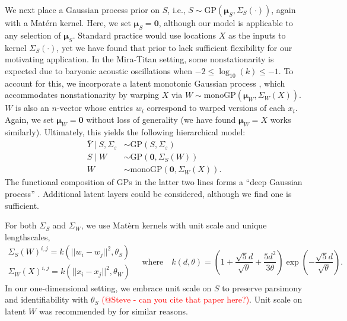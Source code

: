 \documentclass[11pt]{article}
\begin{document}
We next place a Gaussian process prior on $S$, i.e.,
$S\sim \mathrm{GP}\left(\boldsymbol{\mu}_S, \Sigma_S(\cdot)\right)$, again with a 
Mat\'ern kernel. Here, we set $\boldsymbol{\mu}_S=\mathbf{0}$, although our model
is applicable to any selection of $\boldsymbol{\mu}_S$. Standard practice would 
use locations $X$ as the inputs to kernel $\Sigma_S(\cdot)$, yet we have found that 
prior to lack sufficient flexibility for our motivating
application.  In the Mira-Titan setting, some nonstationarity is expected due to 
baryonic acoustic oscillations when $-2 \leq \log_{10}(k) \leq -1$. To account 
for this, we incorporate a latent monotonic Gaussian process \citep[monoGP;][]{barnett2025monotonic},
which accommodates nonstationarity by warping $X$ via 
$W \sim \mathrm{monoGP}\left(\boldsymbol{\mu}_W, \Sigma_W(X)\right)$.
$W$ is also an $n$-vector whose entries $w_i$ correspond to warped versions of each $x_i$.
Again, we set $\boldsymbol{\mu}_W = \mathbf{0}$ without loss of generality (we have
found $\boldsymbol{\mu}_W = X$ works similarly).
Ultimately, this yields the following hierarchical model:
\begin{equation}\label{eq:dgphm}
\begin{aligned}
\bar{Y}\mid S,\Sigma_\varepsilon &\sim \mathrm{GP}(S,\Sigma_\varepsilon) \\
S\mid W &\sim \mathrm{GP}\left(\mathbf{0}, \Sigma_S(W)\right) \\
W &\sim \mathrm{monoGP}\left(\mathbf{0}, \Sigma_W(X)\right).
\end{aligned}
\end{equation}
The functional composition of GPs in the latter two lines forms a ``deep Gaussian process'' 
\citep{damianou2013deep,dunlop2018deep}. Additional latent layers could be considered, 
although we find one is sufficient.

For both $\Sigma_S$ and $\Sigma_W$, we use Mat\`ern kernels with unit scale and
unique lengthscales,
\[
\begin{array}{l}
\Sigma_S(W)^{i,j} = k\left(||w_i - w_j||^2, \theta_S\right) \\[7pt]
\Sigma_W(X)^{i,j} = k\left(||x_i - x_j||^2, \theta_W\right)
\end{array}
\quad\textrm{where}\quad
k(d, \theta) = \left( 1 + \frac{\sqrt{5}d}{\sqrt{\theta}} + 
  \frac{5d^2}{3\theta}\right) \exp\left(-\frac{\sqrt{5}d}{\sqrt{\theta}}\right).
\]
In our one-dimensional setting, we embrace unit scale on $S$ to preserve parsimony 
and identifiability with $\theta_S$ \textcolor{red}{(@Steve - can you cite that paper here?)}.
Unit scale on latent $W$ was recommended by \citet{sauer2023active} for similar reasons.
\end{document}
